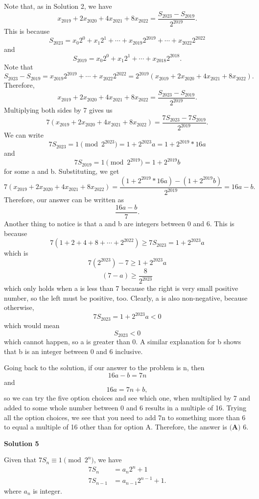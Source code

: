 \begin{enumerate}
Note that, as in Solution 2, we have 
 \[x_{2019} + 2x_{2020} + 4x_{2021} + 8x_{2022} = \frac{S_{2023} - S_{2019}}{2^{2019}}.\] This is because 
 \[S_{2023} = x_{0}2^{0} + x_{1}2^{1} + \cdots + x_{2019}2^{2019} + \cdots + x_{2022}2^{2022}\] and 
 \[S_{2019} = x_{0}2^{0} + x_{1}2^{1} + \cdots + x_{2018}2^{2018}.\] Note that 
 \[S_{2023} - S_{2019} = x_{2019}2^{2019} + \cdots + x_{2022}2^{2022} = 2^{2019}(x_{2019} + 2x_{2020} + 4x_{2021} + 8x_{2022}).\] Therefore, 
 \[x_{2019} + 2x_{2020} + 4x_{2021} + 8x_{2022} = \frac{S_{2023} - S_{2019}}{2^{2019}}.\] Multiplying both sides by 7 gives us 
 \[7(x_{2019} + 2x_{2020} + 4x_{2021} + 8x_{2022}) = \frac{7S_{2023} - 7S_{2019}}{2^{2019}}.\] We can write 
 \[7S_{2023} = 1\pmod{2^{2023}} = 1 + 2^{2023}a = 1 + 2^{2019}*16a\] and 
 \[7S_{2019} = 1\pmod{2^{2019}} = 1 + 2^{2019}b\] for some a and b. Substituting, we get 
 \[7(x_{2019} + 2x_{2020} + 4x_{2021} + 8x_{2022}) = \frac{(1 + 2^{2019} * 16a) - (1 + 2^{2019}b)}{2^{2019}} = 16a - b.\] Therefore, our answer can be written as 
 \[\frac{16a - b}{7}.\] Another thing to notice is that a and b are integers between 0 and 6. This is because 
 \[7(1 + 2 + 4 + 8 + \cdots + 2^{2022}) \geqslant 7S_{2023} = 1 + 2^{2023}a\] which is 
 \[7(2^{2023}) - 7 \geqslant 1 + 2^{2023}a\] 
 \[(7-a) \geqslant \frac{8}{2^{2023}}\] which only holds when a is less than 7 because the right is very small positive number, so the left must be positive, too. Clearly, a is also non-negative, because otherwise, 
 \[7S_{2023} = 1 + 2^{2023}a < 0\] which would mean 
 \[S_{2023} < 0\] which cannot happen, so a is greater than 0.  A similar explanation for b shows that b is an integer between 0 and 6 inclusive. 

 Going back to the solution, if our answer to the problem is n, then 
 \[16a - b = 7n\] and 
 \[16a = 7n + b,\] so we can try the five option choices and see which one, when multiplied by 7 and added to some whole number between 0 and 6 results in a multiple of 16. Trying all the option choices, we see that you need to add 7n to something more than 6 to equal a multiple of 16 other than for option A. Therefore, the answer is $\boxed{\textbf{(A) } 6}.$




\textbf{Solution 5}

Given that $7S_n \equiv 1 \pmod{2^n}$, we have
 \begin{align*} 7S_n &= a_n2^n + 1\\ 7S_{n-1} &= a_{n-1}2^{n-1} + 1. \end{align*}
where $a_n$ is integer.


\end{enumerate}
